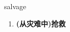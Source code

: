
\begin{frame}
{\huge salvage}
\begin{center}
\begin{enumerate}\Large
  \item \textbf{(从灾难中)抢救}
\end{enumerate}
\end{center}
\end{frame}

